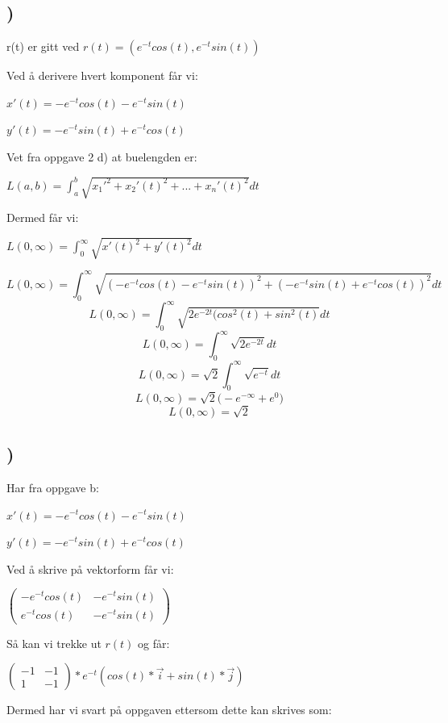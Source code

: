 \documentclass[a4paper,10pt,norsk]{article}
\begin{document}
\pagebreak

\subsection{)}
r(t) er gitt ved $ r(t) = (e^{-t}cos(t), e^{-t}sin(t))$

Ved å derivere hvert komponent får vi:

$x'(t) = -e^{-t}cos(t) - e^{-t}sin(t)$

$y'(t) = -e^{-t}sin(t) + e^{-t}cos(t)$

Vet fra oppgave 2 d) at buelengden er:

$L(a, b) = \int_{a}^{b} \sqrt{x_{1}'^{2} + x_{2}'(t)^{2} + ... + x_{n}'(t)^{2}} dt$

Dermed får vi:

$L(0, \infty) = \int_{0}^{\infty} \sqrt{x'(t)^{2} + y'(t)^{2}} dt $

\[L(0, \infty) = \int_{0}^{\infty} \sqrt{(-e^{-t}cos(t) - e^{-t}sin(t))^{2} + (-e^{-t}sin(t) + e^{-t}cos(t))^{2}} dt \]
\[L(0, \infty) = \int_{0}^{\infty} \sqrt{2e^{-2t}(cos^{2}(t) + sin^{2}(t)} dt\]
\[L(0, \infty) = \int_{0}^{\infty} \sqrt{2e^{-2t}}dt\]
\[L(0, \infty) = \sqrt{2}\int_{0}^{\infty} \sqrt{e^{-t}}dt\]
\[L(0, \infty) = \sqrt{2}\Bigg( -e^{-\infty} + e^{0}\Bigg)\]
\[L(0, \infty) = \sqrt{2}\]

\subsection{)}

Har fra oppgave b:

$x'(t) = -e^{-t}cos(t) - e^{-t}sin(t)$

$y'(t) = -e^{-t}sin(t) + e^{-t}cos(t)$

Ved å skrive på vektorform får vi:

$\left(\begin{matrix} -e^{-t}cos(t)&-e^{-t}sin(t)\\e^{-t}cos(t)&-e^{-t}sin(t) \end{matrix}\right)$

Så kan vi trekke ut $r(t)$ og får:

$\left(\begin{matrix} -1&-1\\1&-1 \end{matrix}\right) * e^{-t}(cos(t)*\vec{i} + sin(t)*\vec{j})$

Dermed har vi svart på oppgaven ettersom dette kan skrives som:
\end{document}
